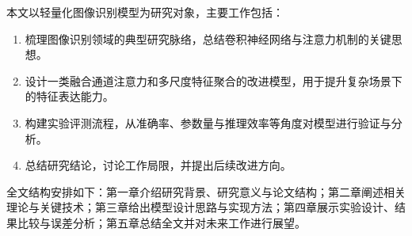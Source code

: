 本文以轻量化图像识别模型为研究对象，主要工作包括：

\begin{enumerate}
  \item 梳理图像识别领域的典型研究脉络，总结卷积神经网络与注意力机制的关键思想。
  \item 设计一类融合通道注意力和多尺度特征聚合的改进模型，用于提升复杂场景下的特征表达能力。
  \item 构建实验评测流程，从准确率、参数量与推理效率等角度对模型进行验证与分析。
  \item 总结研究结论，讨论工作局限，并提出后续改进方向。
\end{enumerate}

全文结构安排如下：第一章介绍研究背景、研究意义与论文结构；第二章阐述相关理论与关键技术；第三章给出模型设计思路与实现方法；第四章展示实验设计、结果比较与误差分析；第五章总结全文并对未来工作进行展望。

